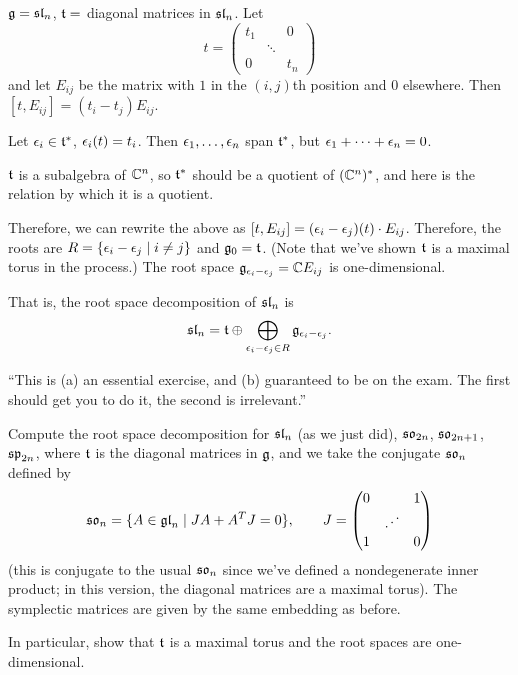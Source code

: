 \begin{example}
$\g = \sl_n$, $\at = $ diagonal matrices in $\sl_n$. Let
\[
  t = \begin{pmatrix} t_1 & & 0 \\ & \ddots & \\ 0 & & t_n \end{pmatrix}
\]
and let $E_{ij}$ be the matrix with $1$ in the $(i, j)$th position and $0$
elsewhere. Then $[t, E_{ij}] = (t_i - t_j)E_{ij}$.

Let $\eps_i \in \at^*$, $\eps_i(t) = t_i$. Then $\eps_1, \dots, \eps_n$ span
$\at^*$, but $\eps_1 + \dots + \eps_n = 0$.

\begin{remark}
$\at$ is a subalgebra of $\C^n$, so $\at^*$ should be a quotient of
$(\C^n)^*$, and here is the relation by which it is a quotient.
\end{remark}

Therefore, we can rewrite the above as
$[t, E_{ij}] = (\eps_i - \eps_j)(t) \cdot E_{ij}$. Therefore, the roots are
$R = \setc{\eps_i - \eps_j}{i \neq j}$ and $\g_0 = \at$. (Note that we've shown
$\at$ is a maximal torus in the process.) The root space
$\g_{\eps_i - \eps_j} = \C E_{ij}$ is one-dimensional.

That is, the root space decomposition of $\sl_n$ is
\[
  \sl_n = \at \oplus \bigoplus_{\eps_i - \eps_j \in R} \g_{\eps_i - \eps_j}.
\]
\end{example}

\begin{exercise}
``This is (a) an essential exercise, and (b) guaranteed to be on the exam. The
first should get you to do it, the second is irrelevant.''

Compute the root space decomposition for $\sl_n$ (as we just did),
$\so_{2n}$, $\so_{2n+1}$, $\spl_{2n}$, where $\at$ is the diagonal matrices
in $\g$, and we take the conjugate $\so_n$ defined by
\[
  \so_n = \setc{A \in \gl_n}{JA + A^TJ = 0}, \qquad
  J = \begin{pmatrix} 0 & & 1 \\ & \iddots & \\ 1 & & 0 \end{pmatrix}
\]
(this is conjugate to the usual $\so_n$ since we've defined a nondegenerate
inner product; in this version, the diagonal matrices are a maximal torus).
The symplectic matrices are given by the same embedding as before.

In particular, show that $\at$ is a maximal torus and the root spaces are
one-dimensional.
\end{exercise}

